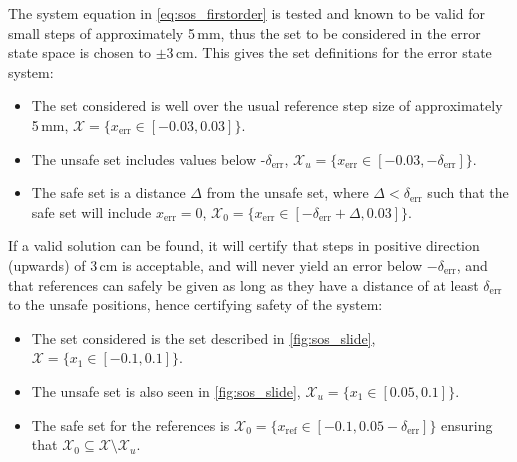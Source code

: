 The system equation in \autoref{eq:sos_firstorder} is tested and known to be valid for small steps of approximately 5\,mm, thus the set to be considered in the error state space is chosen to $\pm 3$\,cm. This gives the set definitions for the error state system:
\vspace{-3mm}
\begin{itemize}
\itemsep-0.7mm
\item The set considered is well over the usual reference step size of approximately 5\,mm, $\mathcal{X}=\{x_\text{err}\in[-0.03,0.03] \}$.
\item The unsafe set includes values below -$\delta_\text{err}$, $\mathcal{X}_u=\{x_\text{err}\in [-0.03,-\delta_\text{err}] \}$.
\item The safe set is a distance $\Delta$ from the unsafe set, where $\Delta<\delta_\text{err}$ such that the safe set will include $x_\text{err}=0$, $\mathcal{X}_0=\{x_\text{err}\in [-\delta_\text{err}+\Delta,0.03] \}$.
\end{itemize}

If a valid solution can be found, it will certify that steps in positive direction (upwards) of 3\,cm is acceptable, and will never yield an error below $-\delta_\text{err}$, and that references can safely be given as long as they have a distance of at least $\delta_\text{err}$ to the unsafe positions, hence certifying safety of the system: %
\vspace{-3mm}
\begin{itemize}
	\itemsep-0.7mm
	\item The set considered is the set described in \autoref{fig:sos_slide}, $\mathcal{X}=\{x_1\in[-0.1,0.1] \}$.
	\item The unsafe set is also seen in \autoref{fig:sos_slide}, $\mathcal{X}_u=\{x_1\in [0.05,0.1] \}$.
	\item The safe set for the references is $\mathcal{X}_0=\{x_\text{ref}\in [-0.1,0.05-\delta_\text{err}] \}$ ensuring that $\mathcal{X}_0\subseteq\mathcal{X}\setminus\mathcal{X}_u$.
\end{itemize}

